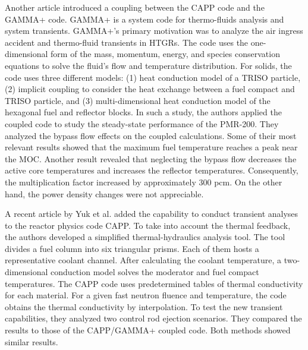 Another article \cite{tak_cappgamma_2016} introduced a coupling between the CAPP code and the GAMMA+ code.
GAMMA+ is a system code for thermo-fluids analysis and system transients.
GAMMA+'s primary motivation was to analyze the air ingress accident and thermo-fluid transients in \glspl{HTGR}.
The code uses the one-dimensional form of the mass, momentum, energy, and species conservation equations to solve the fluid's flow and temperature distribution.
For solids, the code uses three different models: (1) heat conduction model of a TRISO particle, (2) implicit coupling to consider the heat exchange between a fuel compact and TRISO particle, and (3) multi-dimensional heat conduction model of the hexagonal fuel and reflector blocks.
In such a study, the authors applied the coupled code to study the steady-state performance of the PMR-200.
They analyzed the bypass flow effects on the coupled calculations.
Some of their most relevant results showed that the maximum fuel temperature reaches a peak near the \gls{MOC}.
Another result revealed that neglecting the bypass flow decreases the active core temperatures and increases the reflector temperatures.
Consequently, the multiplication factor increased by approximately 300 pcm.
On the other hand, the power density changes were not appreciable.

A recent article by Yuk et al. \cite{yuk_time-dependent_2020} added the capability to conduct transient analyses to the reactor physics code CAPP.
To take into account the thermal feedback, the authors developed a simplified thermal-hydraulics analysis tool.
The tool divides a fuel column into six triangular prisms.
Each of them hosts a representative coolant channel.
After calculating the coolant temperature, a two-dimensional conduction model solves the moderator and fuel compact temperatures.
The CAPP code uses predetermined tables of thermal conductivity for each material.
For a given fast neutron fluence and temperature, the code obtains the thermal conductivity by interpolation.
To test the new transient capabilities, they analyzed two control rod ejection scenarios.
They compared the results to those of the CAPP/GAMMA+ coupled code.
Both methods showed similar results.

